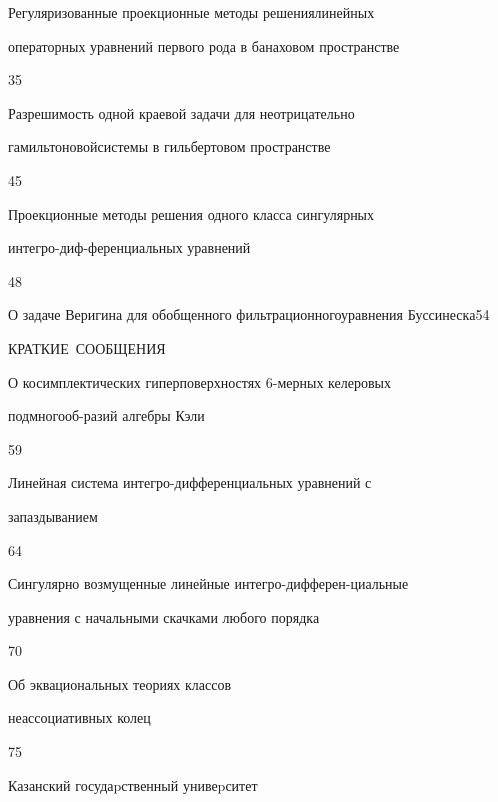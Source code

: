 

{Регуляризованные проекционные методы решения\newline линейных


операторных уравнений первого рода в банаховом пространстве}{35}




{Разрешимость одной краевой задачи для неотрицательно


гамильтоновой\newline системы в гильбертовом пространстве}{45}




{Проекционные методы решения одного класса сингулярных


интегро-диф-\newline ференциальных уравнений}{48}




{О задаче Веригина для обобщенного фильтрационного\newline уравнения Буссинеска}{54}





\bigskip


\par


\centerline{\Large КРАТКИЕ~СООБЩЕНИЯ}


\bigskip







{О косимплектических гиперповерхностях $6$-мерных келеровых


подмногооб-\newline разий алгебры Кэли}{59}




{Линейная система интегро-дифференциальных уравнений с 


запаздыванием}{64}




{Сингулярно возмущенные линейные интегро-дифферен-\newline циальные


уравнения с начальными скачками любого порядка}{70}




{Об эквациональных теориях классов  


неассоциативных колец}{75}











\vfill


\noindent\raisebox{2pt}{\copyright} Казанский госудаpственный унивеpситет





